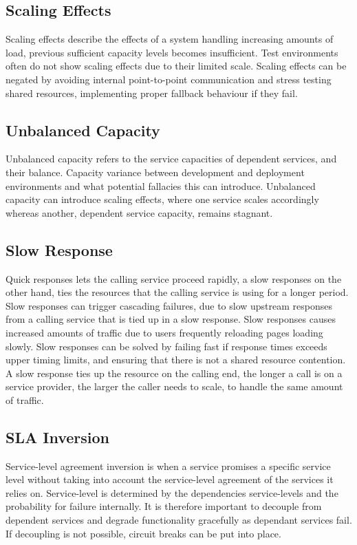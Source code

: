 \subsection{Scaling Effects}
Scaling effects describe the effects of a system handling increasing amounts of load, previous sufficient capacity levels becomes insufficient. Test environments often do not show scaling effects due to their limited scale.
Scaling effects can be negated by avoiding internal point-to-point communication and stress testing shared resources, implementing proper fallback behaviour if they fail.

\subsection{Unbalanced Capacity}
Unbalanced capacity refers to the service capacities of dependent services, and their balance. Capacity variance between development and deployment environments and what potential fallacies this can introduce. Unbalanced capacity can introduce scaling effects, where one service scales accordingly whereas another, dependent service capacity, remains stagnant.

\subsection{Slow Response}
Quick responses lets the calling service proceed rapidly, a slow responses on the other hand, ties the resources that the calling service is using for a longer period. Slow responses can trigger cascading failures, due to slow upstream responses from a calling service that is tied up in a slow response. Slow responses causes increased amounts of traffic due to users frequently reloading pages loading slowly. Slow responses can be solved by failing fast if response times exceeds upper timing limits, and ensuring that there is not a shared resource contention.
A slow response ties up the resource on the calling end, the longer a call is on a service provider, the larger the caller needs to scale, to handle the same amount of traffic.

\subsection{SLA Inversion}
Service-level agreement inversion is when a service promises a specific service level without taking into account the service-level agreement of the services it relies on. Service-level is determined by the dependencies service-levels and the probability for failure internally. It is therefore important to decouple from dependent services and degrade functionality gracefully as dependant services fail. If decoupling is not possible, circuit breaks can be put into place. 

